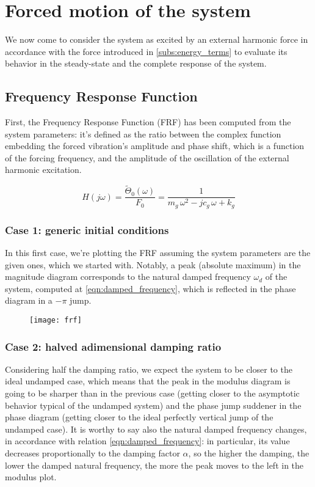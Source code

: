 \documentclass[a4paper,12pt,oneside]{article}
\begin{document}
\section{Forced motion of the system}

We now come to consider the system as excited by an external harmonic force in accordance with the force introduced in \ref{subs:energy_terms} to evaluate its behavior in the steady-state and the complete response of the system.

\subsection{Frequency Response Function}

First, the Frequency Response Function (FRF) has been computed from the system parameters: it's defined as the ratio between the complex function embedding the forced vibration's amplitude and phase shift, which is a function of the forcing frequency, and the amplitude of the oscillation of the external harmonic excitation.

\[
	H(j\omega) = \frac{\tilde{\Theta}_0(\omega)}{F_0} = %
		\frac{1}{m_g \, \omega^2 - j c_g \, \omega + k_g}
\]

\subsubsection*{Case 1: generic initial conditions}

In this first case, we're plotting the FRF assuming the system parameters are the given ones, which we started with. Notably, a peak (absolute maximum) in the magnitude diagram corresponds to the natural damped frequency $ \omega_d $ of the system, computed at \eqref{eqn:damped_frequency}, which is reflected in the phase diagram in a $ -\pi $ jump.

\begin{figure}
	\centering
	\texttt{[image: frf]}
\end{figure}

\subsubsection*{Case 2: halved adimensional damping ratio}

Considering half the damping ratio, we expect the system to be closer to the ideal undamped case, which means that the peak in the modulus diagram is going to be sharper than in the previous case (getting closer to the asymptotic behavior typical of the undamped system) and the phase jump suddener in the phase diagram (getting closer to the ideal perfectly vertical jump of the undamped case). It is worthy to say also the natural damped frequency changes, in accordance with relation \eqref{eqn:damped_frequency}: in particular, its value decreases proportionally to the damping factor $ \alpha $, so the higher the damping, the lower the damped natural frequency, the more the peak moves to the left in the modulus plot.
\end{document}
